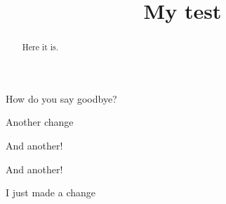\documentclass{ximera}
\title{My test}
\begin{document}
\begin{abstract}
  Here it is.
\end{abstract}
\maketitle



\begin{multipleChoice}
  How do you say goodbye?
\end{multipleChoice}

Another change

And another!

And another!

I just made a change
\end{document}
